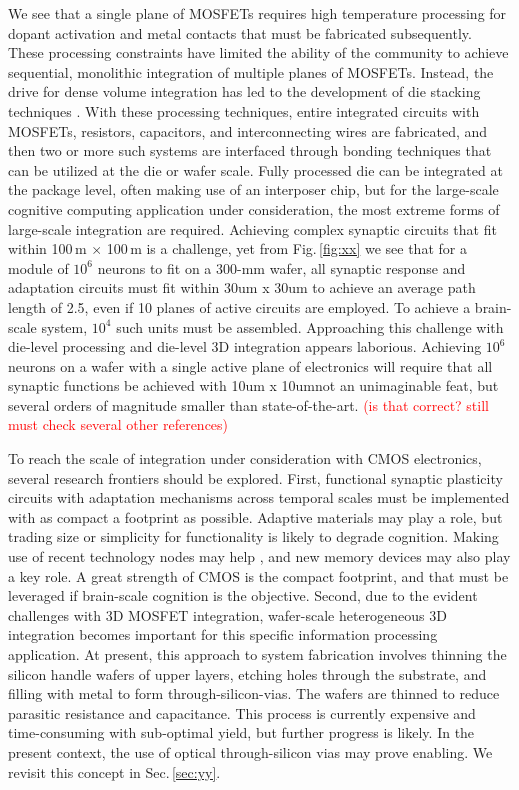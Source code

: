\documentclass[twocolumn]{article}
\begin{document}
We see that a single plane of MOSFETs requires high temperature processing for dopant activation and metal contacts that must be fabricated subsequently. These processing constraints have limited the ability of the community to achieve sequential, monolithic integration of multiple planes of MOSFETs. Instead, the drive for dense volume integration has led to the development of die stacking techniques \cite{elfe2016}. With these processing techniques, entire integrated circuits with MOSFETs, resistors, capacitors, and interconnecting wires are fabricated, and then two or more such systems are interfaced through bonding techniques that can be utilized at the die or wafer scale. Fully processed die can be integrated at the package level, often making use of an interposer chip, but for the large-scale cognitive computing application under consideration, the most extreme forms of large-scale integration are required. Achieving complex synaptic circuits that fit within 100\,\textmu m $\times$ 100\,\textmu m is a challenge, yet from Fig.\,\ref{fig:xx} we see that for a module of $10^6$ neurons to fit on a 300-mm wafer, all synaptic response and adaptation circuits must fit within 30um x 30um to achieve an average path length of 2.5, even if 10 planes of active circuits are employed. To achieve a brain-scale system, $10^4$ such units must be assembled. Approaching this challenge with die-level processing and die-level 3D integration appears laborious. Achieving $10^6$ neurons on a wafer with a single active plane of electronics will require that all synaptic functions be achieved with 10um x 10um\textemdash not an unimaginable feat, but several orders of magnitude smaller than state-of-the-art. \textcolor{red}{(is that correct? still must check several other references)}

To reach the scale of integration under consideration with CMOS electronics, several research frontiers should be explored. First, functional synaptic plasticity circuits with adaptation mechanisms across temporal scales must be implemented with as compact a footprint as possible. Adaptive materials may play a role, but trading size or simplicity for functionality is likely to degrade cognition. Making use of recent technology nodes may help \cite{rupa2019}, and new memory devices may also play a key role. A great strength of CMOS is the compact footprint, and that must be leveraged if brain-scale cognition is the objective. Second, due to the evident challenges with 3D MOSFET integration, wafer-scale heterogeneous 3D integration becomes important for this specific information processing application. At present, this approach to system fabrication involves thinning the silicon handle wafers of upper layers, etching holes through the substrate, and filling with metal to form through-silicon-vias. The wafers are thinned to reduce parasitic resistance and capacitance. This process is currently expensive and time-consuming with sub-optimal yield, but further progress is likely. In the present context, the use of optical through-silicon vias may prove enabling. We revisit this concept in Sec.\,\ref{sec:yy}. 
\end{document}
